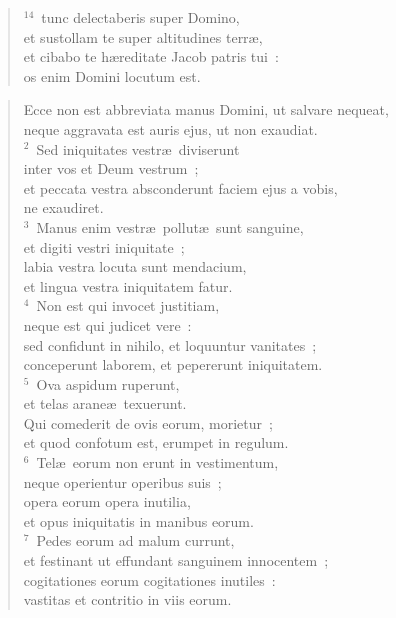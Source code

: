 \begin{flushleft}
\begin{verse}
${}^{14}$~tunc delectaberis super Domino,\\ et sustollam te super altitudines terr\ae ,\\ et cibabo te h\ae reditate Jacob patris tui~:\\ os enim Domini locutum est.\end{verse}\end{flushleft}


\begin{flushleft}\begin{verse}\vspace{-19pt}\hspace{6pt}Ecce non est abbreviata manus Domini, ut salvare nequeat,\\\hspace{6pt} neque aggravata est auris ejus, ut non exaudiat.\\
${}^{2}$~Sed iniquitates vestr\ae\ diviserunt\\ inter vos et Deum vestrum~;\\ et peccata vestra absconderunt faciem ejus a vobis,\\ ne exaudiret.\\
${}^{3}$~Manus enim vestr\ae\ pollut\ae\ sunt sanguine,\\ et digiti vestri iniquitate~;\\ labia vestra locuta sunt mendacium,\\ et lingua vestra iniquitatem fatur.\\
${}^{4}$~Non est qui invocet justitiam,\\ neque est qui judicet vere~:\\ sed confidunt in nihilo, et loquuntur vanitates~;\\ conceperunt laborem, et pepererunt iniquitatem.\\
${}^{5}$~Ova aspidum ruperunt,\\ et telas arane\ae\ texuerunt.\\ Qui comederit de ovis eorum, morietur~;\\ et quod confotum est, erumpet in regulum.\\
${}^{6}$~Tel\ae\ eorum non erunt in vestimentum,\\ neque operientur operibus suis~;\\ opera eorum opera inutilia,\\ et opus iniquitatis in manibus eorum.\\
${}^{7}$~Pedes eorum ad malum currunt,\\ et festinant ut effundant sanguinem innocentem~;\\ cogitationes eorum cogitationes inutiles~:\\ vastitas et contritio in viis eorum.\\

\end{verse}
\end{flushleft}
